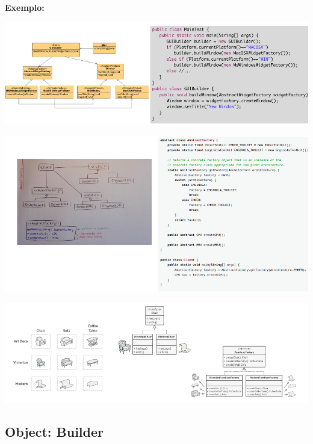\documentclass{article}
\begin{document}
\begin{flushleft}
    \textbf{Exemplo:}

    \begin{center}
        \includegraphics[scale=0.4]{Images/28.png}
    \end{center}

    \pagebreak

    \begin{center}
        \includegraphics[scale=0.5]{Images/29.png}
    \end{center}

    \vspace{5mm}
    \begin{center}
        \includegraphics[scale=0.5]{Images/30.png}
    \end{center}
    
\end{flushleft}

\pagebreak

\subsection{Object: Builder}
\end{document}
